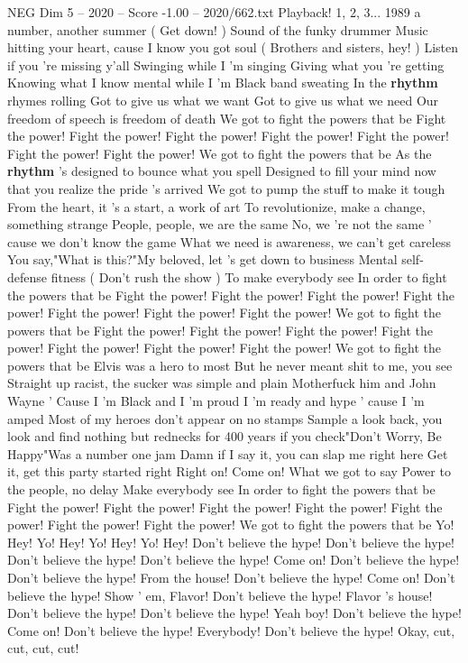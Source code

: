 \begin{textsample}{NEG Dim 5 – 2020 – Score -1.00 – 2020/662.txt}  \label{ex:f5_neg_022}
Playback! 1, 2, 3... 1989 a number, another summer ( Get down! ) Sound of the funky drummer Music hitting your heart, cause I know you got soul ( Brothers and sisters, hey! ) Listen if you 're missing y'all Swinging while I 'm singing Giving what you 're getting Knowing what I know mental while I 'm Black band sweating In the \textbf{rhythm} rhymes rolling Got to give us what we want Got to give us what we need Our freedom of speech is freedom of death We got to fight the powers that be Fight the power!
Fight the power!
Fight the power!
Fight the power!
Fight the power!
Fight the power!
Fight the power!
We got to fight the powers that be As the \textbf{rhythm} 's designed to bounce what you spell Designed to fill your mind now that you realize the pride 's arrived We got to pump the stuff to make it tough From the heart, it 's a start, a work of art To revolutionize, make a change, something strange People, people, we are the same No, we 're not the same ' cause we don't know the game What we need is awareness, we can't get careless You say,"What is this?"My beloved, let 's get down to business Mental self-defense fitness ( Don't rush the show ) To make everybody see In order to fight the powers that be Fight the power!
Fight the power!
Fight the power!
Fight the power!
Fight the power!
Fight the power!
Fight the power!
We got to fight the powers that be Fight the power!
Fight the power!
Fight the power!
Fight the power!
Fight the power!
Fight the power!
Fight the power!
We got to fight the powers that be Elvis was a hero to most But he never meant shit to me, you see Straight up racist, the sucker was simple and plain Motherfuck him and John Wayne ' Cause I 'm Black and I 'm proud I 'm ready and hype ' cause I 'm amped Most of my heroes don't appear on no stamps Sample a look back, you look and find nothing but rednecks for 400 years if you check"Don't Worry, Be Happy"Was a number one jam Damn if I say it, you can slap me right here Get it, get this party started right Right on!
Come on!
What we got to say Power to the people, no delay Make everybody see In order to fight the powers that be Fight the power!
Fight the power!
Fight the power!
Fight the power!
Fight the power!
Fight the power!
Fight the power!
We got to fight the powers that be Yo!
Hey!
Yo!
Hey!
Yo!
Hey!
Yo!
Hey!
Don't believe the hype!
Don't believe the hype!
Don't believe the hype!
Don't believe the hype!
Come on!
Don't believe the hype!
Don't believe the hype!
From the house!
Don't believe the hype!
Come on!
Don't believe the hype!
Show ' em, Flavor!
Don't believe the hype!
Flavor 's house!
Don't believe the hype!
Don't believe the hype!
Yeah boy!
Don't believe the hype!
Come on!
Don't believe the hype!
Everybody!
Don't believe the hype!
Okay, cut, cut, cut, cut!

\end{textsample}
